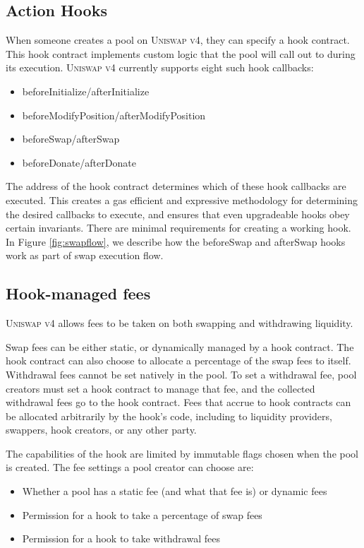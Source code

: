 \documentclass[sigconf,nonacm,prologue,table]{acmart}
\numberwithin{equation}{section}
\theoremstyle{definition}
\theoremstyle{remark}
\begin{document}
\subsection{Action Hooks} \label{actionhooks}

When someone creates a pool on \textsc{Uniswap v4}, they can specify a hook contract. This hook contract implements custom logic that the pool will call out to during its execution. 
\textsc{Uniswap v4} currently supports eight such hook callbacks:

\begin{itemize}
\item beforeInitialize/afterInitialize
\item beforeModifyPosition/afterModifyPosition
\item beforeSwap/afterSwap
\item beforeDonate/afterDonate
\end{itemize}

The address of the hook contract determines which of these hook callbacks are executed. This creates a gas efficient and expressive methodology for determining the desired callbacks to execute, and ensures that even upgradeable hooks obey certain invariants. There are minimal requirements for creating a working hook. In Figure \ref{fig:swapflow}, we describe how the beforeSwap and afterSwap hooks work as part of swap execution flow.

\subsection{Hook-managed fees} \label{hookfees}

\textsc{Uniswap v4} allows fees to be taken on both swapping and withdrawing liquidity. 

Swap fees can be either static, or dynamically managed by a hook contract. The hook contract can also choose to allocate a percentage of the swap fees to itself. Withdrawal fees cannot be set natively in the pool. To set a withdrawal fee, pool creators must set a hook contract to manage that fee, and the collected withdrawal fees go to the hook contract. Fees that accrue to hook contracts can be allocated arbitrarily by the hook’s code, including to liquidity providers, swappers, hook creators, or any other party. 

The capabilities of the hook are limited by immutable flags chosen when the pool is created. The fee settings a pool creator can choose are:
\begin{itemize}
    \item Whether a pool has a static fee (and what that fee is) or dynamic fees
    \item Permission for a hook to take a percentage of swap fees 
    \item Permission for a hook to take withdrawal fees
\end{itemize}
\end{document}
